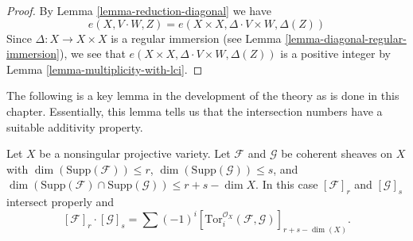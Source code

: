 \begin{proof}
By Lemma \ref{lemma-reduction-diagonal} we have
$$
e(X, V \cdot W, Z) = e(X \times X, \Delta \cdot V \times W, \Delta(Z))
$$
Since $\Delta : X \to X \times X$ is a regular immersion
(see Lemma \ref{lemma-diagonal-regular-immersion}), we see that
$e(X \times X, \Delta \cdot V \times W, \Delta(Z))$ is a positive
integer by Lemma \ref{lemma-multiplicity-with-lci}.
\end{proof}

\noindent
The following is a key lemma in the development of the theory as
is done in this chapter. Essentially, this lemma tells us that
the intersection numbers have a suitable additivity property.

\begin{lemma}
\label{lemma-tor-sheaf}
\begin{reference}
\cite[Chapter V]{Serre_algebre_locale}
\end{reference}
Let $X$ be a nonsingular projective variety. Let $\mathcal{F}$ and
$\mathcal{G}$ be coherent sheaves on $X$ with
$\dim(\text{Supp}(\mathcal{F})) \leq r$,
$\dim(\text{Supp}(\mathcal{G})) \leq s$, and
$\dim(\text{Supp}(\mathcal{F}) \cap \text{Supp}(\mathcal{G}) )
\leq r + s - \dim X$. In this case $[\mathcal{F}]_r$ and $[\mathcal{G}]_s$
intersect properly and
$$
[\mathcal{F}]_r \cdot [\mathcal{G}]_s = \sum (-1)^i
[\text{Tor}_i^{\mathcal{O}_X}(\mathcal{F}, \mathcal{G})]_{r + s - \dim(X)}.
$$
\end{lemma}

